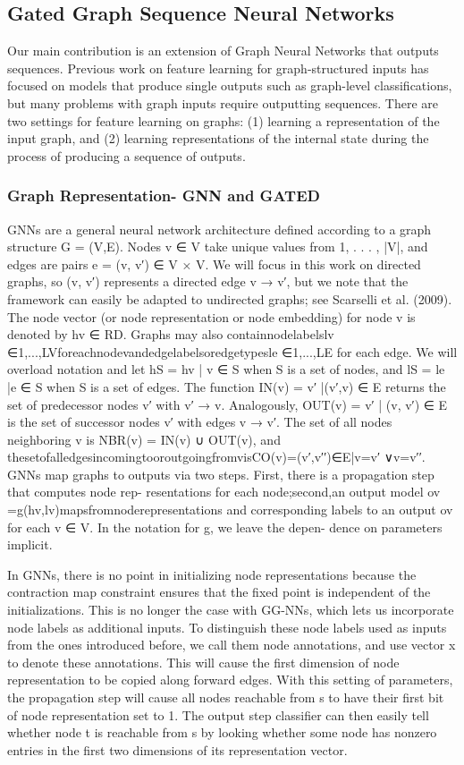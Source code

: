 \documentclass{article}
\begin{document}
\subsection{Gated Graph Sequence Neural Networks}
Our main contribution is an extension of Graph Neural Networks that outputs sequences. Previous work on feature learning for graph-structured inputs has focused on models that produce single outputs such as graph-level classifications, but many problems with graph inputs require outputting sequences. There are two settings for feature learning on graphs: (1) learning a representation of the input graph, and (2) learning representations of the internal state during the process of producing a sequence of outputs. 
\subsubsection{Graph Representation- GNN and GATED}
GNNs are a general neural network architecture defined according to a graph structure G = (V,E). Nodes v ∈ V take unique values from 1, . . . , |V|, and edges are pairs e = (v, v′) ∈ V × V. We will focus in this work on directed graphs, so (v, v′) represents a directed edge v → v′, but we note that the framework can easily be adapted to undirected graphs; see Scarselli et al. (2009). The node vector (or node representation or node embedding) for node v is denoted by hv ∈ RD. Graphs may also containnodelabelslv ∈{1,...,LV}foreachnodevandedgelabelsoredgetypesle ∈{1,...,LE} for each edge. We will overload notation and let hS = {hv | v ∈ S} when S is a set of nodes, and lS = {le |e ∈ S} when S is a set of edges. The function IN(v) = {v′ |(v′,v) ∈ E} returns the set of predecessor nodes v′ with v′ → v. Analogously, OUT(v) = {v′ | (v, v′) ∈ E} is the set of successor nodes v′ with edges v → v′. The set of all nodes neighboring v is NBR(v) = IN(v) ∪ OUT(v), and thesetofalledgesincomingtooroutgoingfromvisCO(v)={(v′,v′′)∈E|v=v′ ∨v=v′′}.
GNNs map graphs to outputs via two steps. First, there is a propagation step that computes node rep- resentations for each node;second,an output model ov =g(hv,lv)mapsfromnoderepresentations and corresponding labels to an output ov for each v ∈ V. In the notation for g, we leave the depen- dence on parameters implicit.

In GNNs, there is no point in initializing node representations because the contraction map constraint ensures that the fixed point is independent of the initializations. This is no longer the case with GG-NNs, which lets us incorporate node labels as additional inputs. To distinguish these node labels used as inputs from the ones introduced before, we call them node annotations, and use vector x to denote these annotations. This will cause the first dimension of node representation to be copied along forward edges. With this setting of parameters, the propagation step will cause all nodes reachable from s to have their first bit of node representation set to 1. The output step classifier can then easily tell whether node t is reachable from s by looking whether some node has nonzero entries in the first two dimensions of its representation vector.
\end{document}
